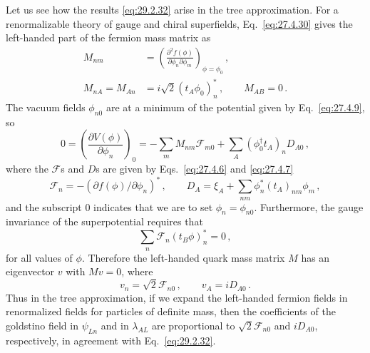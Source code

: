 Let us see how the results \eqref{eq:29.2.32} arise in the tree
approximation. For a renormalizable theory of gauge and chiral
superfields, Eq.~\eqref{eq:27.4.30} gives the left-handed part of the
fermion mass matrix as
\begin{equation}
  \begin{aligned}
  M_{nm}
  &=
  \left(
    \frac{\partial^2f(\phi)}
         {\partial\phi_n\partial\phi_m}
  \right)_{\phi=\phi_0}\,,
  \\
  M_{nA}=M_{An}
  &=i\sqrt{2}(t_A\phi_0)_n^*\,,
  \qquad
  M_{AB}=0\,.
  \end{aligned}
  \tag{29.2.33}\label{eq:29.2.33}
\end{equation}
The vacuum fields \(\phi_{n0}\) are at a minimum of the potential given
by Eq.~\eqref{eq:27.4.9}, so
\begin{equation}
  0
  =
  \left(\frac{\partial V(\phi)}{\partial\phi_n}\right)_0
  =
  -\sum_m M_{nm}\mathcal{F}_{m0}
  +\sum_A(\phi_0^\dagger t_A)_nD_{A0}\,,
  \tag{29.2.34}\label{eq:29.2.34}
\end{equation}
where the \(\mathcal{F}\)s and \(D\)s are given by
Eqs.~\eqref{eq:27.4.6} and \eqref{eq:27.4.7}
\[
  \mathcal{F}_n
  =-\left(\partial f(\phi)/\partial\phi_n\right)^*\,,
  \qquad
  D_A
  =\xi_A+\sum_{nm}\phi_n^*(t_A)_{nm}\phi_m\,,
\]
and the subscript 0 indicates that we are to set
\(\phi_n=\phi_{n0}\). Furthermore, the gauge invariance of the
superpotential requires that
\begin{equation}
  \sum_n\mathcal{F}_n(t_B\phi)_n^*=0\,,
  \tag{29.2.35}\label{eq:29.2.35}
\end{equation}
for all values of \(\phi\). Therefore the left-handed quark mass matrix
\(M\) has an eigenvector \(v\) with \(Mv=0\), where
\begin{equation}
  v_n=\sqrt{2}\mathcal{F}_{n0}\,,
  \qquad
  v_A=iD_{A0}\,.
  \tag{29.2.36}\label{eq:29.2.36}
\end{equation}
Thus in the tree approximation, if we expand the left-handed fermion
fields in renormalized fields for particles of definite mass, then the
coefficients of the goldstino field in \(\psi_{Ln}\) and in
\(\lambda_{AL}\) are proportional to \(\sqrt{2}\mathcal{F}_{n0}\) and
\(iD_{A0}\), respectively, in agreement with Eq.~\eqref{eq:29.2.32}.


